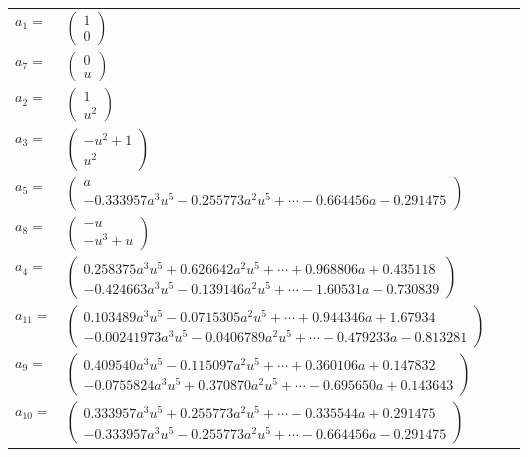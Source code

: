 \documentclass[1p]{elsarticle_modified}
\theoremstyle{definition}
\begin{document}
\begin{tabular}{m{7pt} m{180pt} m{7pt} m{180pt} }
\flushright $a_{1}=$&$\begin{pmatrix}1\\0\end{pmatrix}$ \\
\flushright $a_{7}=$&$\begin{pmatrix}0\\u\end{pmatrix}$ \\
\flushright $a_{2}=$&$\begin{pmatrix}1\\u^2\end{pmatrix}$ \\
\flushright $a_{3}=$&$\begin{pmatrix}- u^2+1\\u^2\end{pmatrix}$ \\
\flushright $a_{5}=$&$\begin{pmatrix}a\\-0.333957 a^{3} u^{5}-0.255773 a^{2} u^{5}+\cdots-0.664456 a-0.291475\end{pmatrix}$ \\
\flushright $a_{8}=$&$\begin{pmatrix}- u\\- u^3+u\end{pmatrix}$ \\
\flushright $a_{4}=$&$\begin{pmatrix}0.258375 a^{3} u^{5}+0.626642 a^{2} u^{5}+\cdots+0.968806 a+0.435118\\-0.424663 a^{3} u^{5}-0.139146 a^{2} u^{5}+\cdots-1.60531 a-0.730839\end{pmatrix}$ \\
\flushright $a_{11}=$&$\begin{pmatrix}0.103489 a^{3} u^{5}-0.0715305 a^{2} u^{5}+\cdots+0.944346 a+1.67934\\-0.00241973 a^{3} u^{5}-0.0406789 a^{2} u^{5}+\cdots-0.479233 a-0.813281\end{pmatrix}$ \\
\flushright $a_{9}=$&$\begin{pmatrix}0.409540 a^{3} u^{5}-0.115097 a^{2} u^{5}+\cdots+0.360106 a+0.147832\\-0.0755824 a^{3} u^{5}+0.370870 a^{2} u^{5}+\cdots-0.695650 a+0.143643\end{pmatrix}$ \\
\flushright $a_{10}=$&$\begin{pmatrix}0.333957 a^{3} u^{5}+0.255773 a^{2} u^{5}+\cdots-0.335544 a+0.291475\\-0.333957 a^{3} u^{5}-0.255773 a^{2} u^{5}+\cdots-0.664456 a-0.291475\end{pmatrix}$ \\

\end{tabular}
\end{document}
